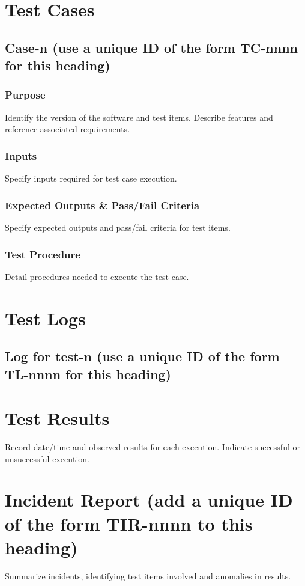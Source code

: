 \documentclass{article}
\begin{document}
\section{Test Cases}

\subsection{Case-n (use a unique ID of the form TC-nnnn for this heading)}

\subsubsection{Purpose}

Identify the version of the software and test items. Describe features and reference associated requirements.

\subsubsection{Inputs}

Specify inputs required for test case execution.

\subsubsection{Expected Outputs \& Pass/Fail Criteria}

Specify expected outputs and pass/fail criteria for test items.

\subsubsection{Test Procedure}

Detail procedures needed to execute the test case.

\section{Test Logs}

\subsection{Log for test-n (use a unique ID of the form TL-nnnn for this heading)}

\section{Test Results}

Record date/time and observed results for each execution. Indicate successful or unsuccessful execution.

\section{Incident Report (add a unique ID of the form TIR-nnnn to this heading)}

Summarize incidents, identifying test items involved and anomalies in results.
\end{document}
